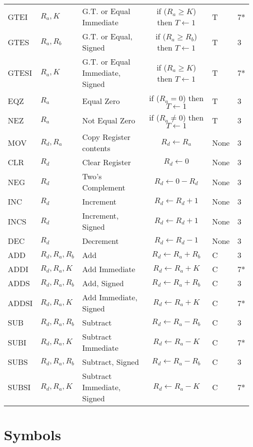 \documentclass[12pt,twoside]{report}
\begin{document}
{\begin{longtable}{ | l | l | l | c | l | l | }
GTEI & $R_a, K$ & G.T. or Equal Immediate & if ($R_a \ge K$) then $T \leftarrow 1$ & T & 7* \\
GTES & $R_a, R_b$ & G.T. or Equal, Signed & if ($R_a \ge R_b$) then $T \leftarrow 1$ & T & 3 \\
GTESI & $R_a, K$ & G.T. or Equal Immediate, Signed & if ($R_a \ge K$) then $T \leftarrow 1$ & T & 7* \\
EQZ & $R_a$ & Equal Zero & if ($R_a = 0$) then $T \leftarrow 1$ & T & 3 \\
NEZ & $R_a$ & Not Equal Zero & if ($R_a \neq 0$) then $T \leftarrow 1$ & T & 3 \\
MOV & $R_d, R_a$ & Copy Register contents & $R_d \leftarrow R_a$ & None & 3 \\
CLR & $R_d$ & Clear Register & $R_d \leftarrow 0$ & None & 3 \\
NEG & $R_d$ & Two's Complement & $R_d \leftarrow 0 - R_d$ & None & 3 \\
INC & $R_d$ & Increment & $R_d \leftarrow R_d + 1$ & None & 3 \\
INCS & $R_d$ & Increment, Signed & $R_d \leftarrow R_d + 1$ & None & 3 \\
DEC & $R_d$ & Decrement & $R_d \leftarrow R_d - 1$ & None & 3 \\
ADD & $R_d, R_a, R_b$ & Add & $R_d \leftarrow R_a + R_b$ & C & 3 \\
ADDI & $R_d, R_a, K$ & Add Immediate & $R_d \leftarrow R_a + K$ & C & 7* \\
ADDS & $R_d, R_a, R_b$ & Add, Signed & $R_d \leftarrow R_a + R_b$ & C & 3 \\
ADDSI & $R_d, R_a, K$ & Add Immediate, Signed & $R_d \leftarrow R_a + K$ & C & 7* \\
SUB & $R_d, R_a, R_b$ & Subtract & $R_d \leftarrow R_a - R_b$ & C & 3 \\
SUBI & $R_d, R_a, K$ & Subtract Immediate & $R_d \leftarrow R_a - K$ & C & 7* \\
SUBS & $R_d, R_a, R_b$ & Subtract, Signed & $R_d \leftarrow R_a - R_b$ & C & 3 \\
SUBSI & $R_d, R_a, K$ & Subtract Immediate, Signed & $R_d \leftarrow R_a - K$ & C & 7* \\
 \hline
\end{longtable}}

\section{Symbols}
\end{document}
